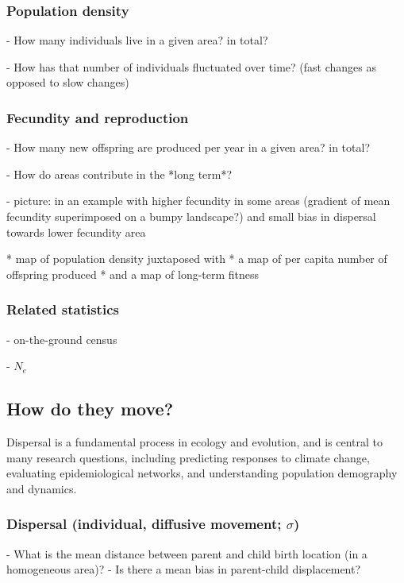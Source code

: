 \documentclass{ar-1col}
\begin{document}
\subsubsection{Population density}
        - How many individuals live in a given area? in total?

        - How has that number of individuals fluctuated over time? (fast changes as opposed to slow changes)

\subsubsection{Fecundity and reproduction}
        - How many new offspring are produced per year in a given area? in total?

        - How do areas contribute in the *long term*?

        - picture: 
            in an example with higher fecundity in some areas 
            (gradient of mean fecundity superimposed on a bumpy landscape?)
            and small bias in dispersal towards lower fecundity area

            * map of population density juxtaposed with
            * a map of per capita number of offspring produced
            * and a map of long-term fitness 
            
\subsubsection{Related statistics}
        - on-the-ground census
        
        - $N_e$

\subsection{How do they move?}
Dispersal is a fundamental process in ecology and evolution, 
and is central to many research questions, 
including predicting responses to climate change,
evaluating epidemiological networks, 
and understanding population demography and dynamics.

\subsubsection{Dispersal (individual, diffusive movement; $\sigma$)}

        - What is the mean distance between parent and child birth location (in a homogeneous area)?
        - Is there a mean bias in parent-child displacement?
\end{document}

